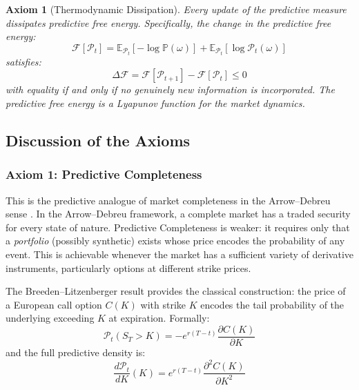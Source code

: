 \documentclass[12pt,a4paper]{article}
\newtheorem{axiom}{Axiom}
\theoremstyle{definition}
\newcommand{\E}{\mathbb{E}}
\newcommand{\Prob}{\mathbb{P}}
\newcommand{\PP}{\mathcal{P}}
\begin{document}
\begin{axiom}[Thermodynamic Dissipation]\label{ax:dissipation}
Every update of the predictive measure dissipates predictive free energy. Specifically, the change in the predictive free energy:
\begin{equation}\label{eq:free_energy_def}
    \mathcal{F}[\PP_t] = \E_{\PP_t}[-\log \Prob(\omega)] + \E_{\PP_t}[\log \PP_t(\omega)]
\end{equation}
satisfies:
\begin{equation}\label{eq:dissipation}
    \Delta \mathcal{F} = \mathcal{F}[\PP_{t+1}] - \mathcal{F}[\PP_t] \leq 0
\end{equation}
with equality if and only if no genuinely new information is incorporated. The predictive free energy is a Lyapunov function for the market dynamics.
\end{axiom}

\subsection{Discussion of the Axioms}

\subsubsection{Axiom 1: Predictive Completeness}

This is the predictive analogue of market completeness in the Arrow--Debreu sense \citep{arrow1954,debreu1959}. In the Arrow--Debreu framework, a complete market has a traded security for every state of nature. Predictive Completeness is weaker: it requires only that a \emph{portfolio} (possibly synthetic) exists whose price encodes the probability of any event. This is achievable whenever the market has a sufficient variety of derivative instruments, particularly options at different strike prices.

The Breeden--Litzenberger result \citep{breeden1978} provides the classical construction: the price of a European call option $C(K)$ with strike $K$ encodes the tail probability of the underlying exceeding $K$ at expiration. Formally:
\begin{equation}\label{eq:breeden_litz}
    \PP_t(S_T > K) = -e^{r(T-t)} \frac{\partial C(K)}{\partial K}
\end{equation}
and the full predictive density is:
\begin{equation}\label{eq:risk_neutral_density}
    \frac{d\PP_t}{dK}(K) = e^{r(T-t)} \frac{\partial^2 C(K)}{\partial K^2}
\end{equation}
\end{document}
